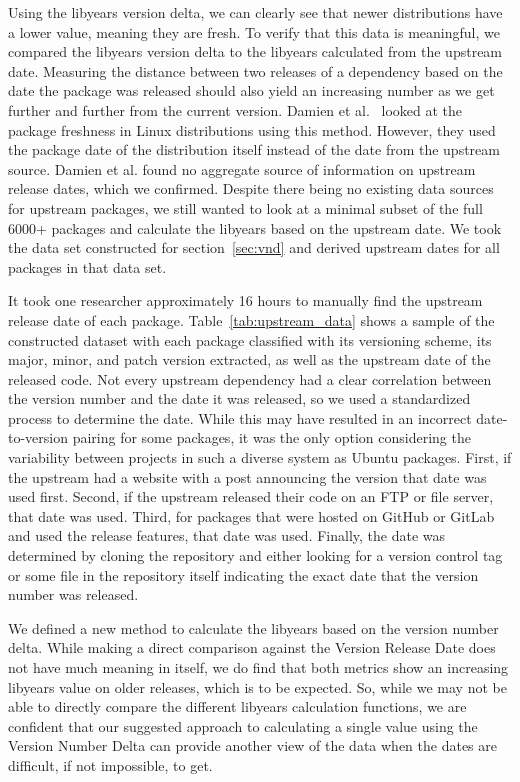 \documentclass[sn-mathphys-num]{sn-jnl}%
\theoremstyle{thmstyleone}%
\theoremstyle{thmstyletwo}%
\theoremstyle{thmstylethree}%
\begin{document}
Using the libyears version delta, we can clearly see that newer distributions have a lower value, meaning they are fresh. To verify that this data is meaningful, we compared the libyears version delta to the libyears calculated from the upstream date. Measuring the distance between two releases of a dependency based on the date the package was released should also yield an increasing number as we get further and further from the current version. Damien et al.~\cite{legay_quantitative_2021} looked at the package freshness in Linux distributions using this method. However, they used the package date of the distribution itself instead of the date from the upstream source. Damien et al. found no aggregate source of information on upstream release dates, which we confirmed. Despite there being no existing data sources for upstream packages, we still wanted to look at a minimal subset of the full 6000+ packages and calculate the libyears based on the upstream date. We took the data set constructed for section~\ref{sec:vnd} and derived upstream dates for all packages in that data set.

It took one researcher approximately 16 hours to manually find the upstream release date of each package. Table~\ref{tab:upstream_data} shows a sample of the constructed dataset with each package classified with its versioning scheme, its major, minor, and patch version extracted, as well as the upstream date of the released code. Not every upstream dependency had a clear correlation between the version number and the date it was released, so we used a standardized process to determine the date. While this may have resulted in an incorrect date-to-version pairing for some packages, it was the only option considering the variability between projects in such a diverse system as Ubuntu packages.
First, if the upstream had a website with a post announcing the version that date was used first. Second, if the upstream released their code on an FTP or file server, that date was used. Third, for packages that were hosted on GitHub or GitLab and used the release features, that date was used. Finally, the date was determined by cloning the repository and either looking for a version control tag or some file in the repository itself indicating the exact date that the version number was released.

We defined a new method to calculate the libyears based on the version number delta. While making a direct comparison against the Version Release Date does not have much meaning in itself, we do find that both metrics show an increasing libyears value on older releases, which is to be expected. So, while we may not be able to directly compare the different libyears calculation functions, we are confident that our suggested approach to calculating a single value using the Version Number Delta can provide another view of the data when the dates are difficult, if not impossible, to get.
\end{document}
